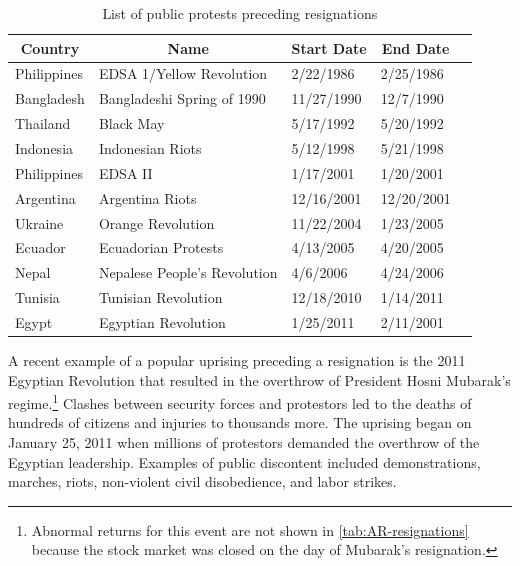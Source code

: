 \documentclass[12pt,final,fleqn]{article}
\theoremstyle{plain}
\begin{document}
\begin{table}[!ht]
\caption{List of public protests preceding resignations} \label{tab:protest-list}
\vspace{-5pt}
\footnotesize
\begin{center}
\begin{threeparttable}
\begin{tabular*}{\textwidth}{l@{\extracolsep{\fill}}llll}
  \hline
    \hline
\multicolumn{1}{c}{Country}&\multicolumn{1}{c}{Name}&\multicolumn{1}{c}{Start Date}&\multicolumn{1}{c}{End Date}\\
  \hline
Philippines & EDSA 1/Yellow Revolution & 2/22/1986 & 2/25/1986\\
Bangladesh & Bangladeshi Spring of 1990 & 11/27/1990 & 12/7/1990\\
Thailand & Black May & 5/17/1992 & 5/20/1992\\
Indonesia & Indonesian Riots & 5/12/1998 & 5/21/1998\\
Philippines & EDSA II & 1/17/2001 & 1/20/2001\\
Argentina & Argentina Riots & 12/16/2001 & 12/20/2001\\
Ukraine & Orange Revolution & 11/22/2004 & 1/23/2005\\
Ecuador & Ecuadorian Protests & 4/13/2005 & 4/20/2005\\
Nepal & Nepalese People's Revolution & 4/6/2006 & 4/24/2006\\
Tunisia & Tunisian Revolution & 12/18/2010 & 1/14/2011\\
Egypt & Egyptian Revolution & 1/25/2011 & 2/11/2001\\
   \hline
   \hline
\end{tabular*}
\scriptsize
\end{threeparttable}
\end{center}
\end{table}

A recent example of a popular uprising preceding a resignation is the 2011 Egyptian Revolution that resulted in the overthrow of President Hosni Mubarak's regime.\footnote{Abnormal returns for this event are not shown in \autoref{tab:AR-resignations} because the stock market was closed on the day of Mubarak's resignation.} Clashes between security forces and protestors led to the deaths of hundreds of citizens and injuries to thousands more. The uprising began on January 25, 2011 when millions of protestors demanded the overthrow of the Egyptian leadership. Examples of public discontent included demonstrations, marches, riots, non-violent civil disobedience, and labor strikes.
\end{document}
